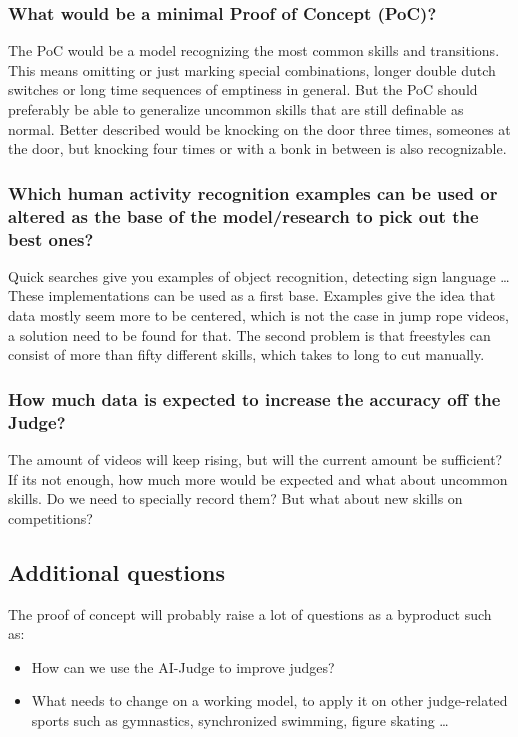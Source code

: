 \subsubsection{What would be a minimal Proof of Concept (PoC)?}

The PoC would be a model recognizing the most common skills and transitions.
This means omitting or just marking special combinations, longer double dutch switches or long time sequences of emptiness in general. But the PoC should preferably be able to generalize uncommon skills that are still definable as normal. Better described would be knocking on the door three times, someones at the door, but knocking four times or with a bonk in between is also recognizable.

\subsubsection{Which human activity recognition examples can be used or altered as the base of the model/research to pick out the best ones?}
Quick searches give you examples of object recognition, detecting sign language \dots
These implementations can be used as a first base.
Examples give the idea that data mostly seem more to be centered, which is not the case in jump rope videos, a solution need to be found for that. The second problem is that freestyles can consist of more than fifty different skills, which takes to long to cut manually.

\subsubsection{How much data is expected to increase the accuracy off the Judge?}

The amount of videos will keep rising, but will the current amount be sufficient? If its not enough, how much more would be expected and what about uncommon skills. Do we need to specially record them? But what about new skills on competitions?

\subsection{Additional questions}

The proof of concept will probably raise a lot of questions as a byproduct such as:

\begin{itemize}
    \item How can we use the AI-Judge to improve judges?
    \item What needs to change on a working model, to apply it on other judge-related sports such as gymnastics, synchronized swimming, figure skating \dots
\end{itemize}


